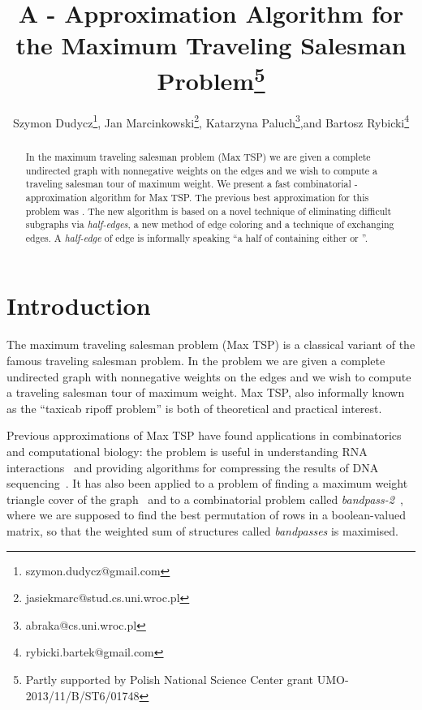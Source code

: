 \documentclass[a4, 11pt]{article}
\title{A  - Approximation Algorithm  for the Maximum  Traveling Salesman Problem\thanks{Partly supported by Polish National Science Center grant UMO-2013/11/B/ST6/01748}}
\author{Szymon Dudycz\thanks{szymon.dudycz@gmail.com}, \enskip
		Jan Marcinkowski\thanks{jasiekmarc@stud.cs.uni.wroc.pl}, \enskip 
		Katarzyna Paluch\thanks{abraka@cs.uni.wroc.pl},\enskip and \enskip
		Bartosz Rybicki\thanks{rybicki.bartek@gmail.com}}
\affil{Institute of Computer Science,  University of Wroc{\l}aw}
\date{}
\newcommand{\<}{\langle}
\renewcommand{\>}{\rangle}
\begin{document}
\maketitle
\thispagestyle{empty}
\begin{abstract}
In the maximum  traveling salesman problem (Max TSP)  we are given a complete undirected graph with nonnegative weights on the edges and we wish to compute a traveling salesman tour of maximum weight. We present a fast combinatorial   - approximation algorithm for Max TSP.
The previous best approximation for this problem was . The new algorithm is based on a novel technique of eliminating difficult subgraphs via {\em half-edges}, a new method of edge coloring and a technique of exchanging edges. A {\it half-edge} of edge  is informally speaking ``a half of  containing either  or ''.

\end{abstract}

\newpage

\section{Introduction}
The maximum  traveling salesman problem (Max TSP) is a classical variant of the
famous traveling salesman problem. In the problem we are given a complete undirected graph
 with nonnegative weights on the edges and we wish to compute a
traveling salesman tour of maximum weight. Max TSP, also informally known as the ``taxicab
ripoff problem'' is both of theoretical and practical interest.

Previous approximations of  Max
TSP have found applications in combinatorics and computational biology: the problem is useful in understanding RNA
interactions~\cite{RNA} and providing algorithms for compressing the results of
DNA sequencing~\cite{DNASEQ}. It has also been  applied to a problem of finding
a maximum weight triangle cover of the graph~\cite{HRTri} and to a combinatorial
problem called \emph{bandpass-2}~\cite{CW}, where we are supposed to find the
best permutation of rows in a boolean-valued matrix, so that the weighted sum of
structures called \emph{bandpasses} is maximised.
\end{document}
